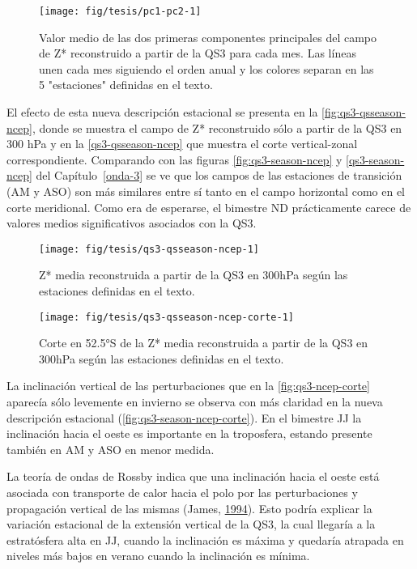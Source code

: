 \documentclass[spanish,a4paper,12pt]{book}
\begin{document}
\begin{figure*}
\texttt{[image: fig/tesis/pc1-pc2-1]} \caption{Valor medio de las dos primeras componentes principales del campo de Z* reconstruido a partir de la QS3 para cada mes. Las líneas unen cada mes siguiendo el orden anual y los colores separan en las 5 "estaciones" definidas en el texto.}\label{fig:pc1-pc2}
\end{figure*}

El efecto de esta nueva descripción estacional se presenta en la
\autoref{fig:qs3-qsseason-ncep}, donde se muestra el campo de Z*
reconstruido sólo a partir de la QS3 en 300 hPa y en la
\autoref{qs3-qsseason-ncep} que muestra el corte vertical-zonal
correspondiente. Comparando con las figuras \ref{fig:qs3-season-ncep} y
\ref{qs3-season-ncep} del Capítulo~\ref{onda-3} se ve que los campos de
las estaciones de transición (AM y ASO) son más similares entre sí tanto
en el campo horizontal como en el corte meridional. Como era de
esperarse, el bimestre ND prácticamente carece de valores medios
significativos asociados con la QS3.

\begin{figure*}
\texttt{[image: fig/tesis/qs3-qsseason-ncep-1]} \caption{Z* media reconstruida a partir de la QS3 en 300hPa según las estaciones definidas en el texto.}\label{fig:qs3-qsseason-ncep}
\end{figure*}

\begin{figure*}
\texttt{[image: fig/tesis/qs3-qsseason-ncep-corte-1]} \caption{Corte en 52.5°S de la Z* media reconstruida a partir de la QS3 en 300hPa según las estaciones definidas en el texto.}\label{fig:qs3-qsseason-ncep-corte}
\end{figure*}

La inclinación vertical de las perturbaciones que en la
\autoref{fig:qs3-ncep-corte} aparecía sólo levemente en invierno se
observa con más claridad en la nueva descripción estacional
(\autoref{fig:qs3-season-ncep-corte}). En el bimestre JJ la inclinación
hacia el oeste es importante en la troposfera, estando presente también
en AM y ASO en menor medida.

La teoría de ondas de Rossby indica que una inclinación hacia el oeste
está asociada con transporte de calor hacia el polo por las
perturbaciones y propagación vertical de las mismas (James,
\protect\hyperlink{ref-James}{1994}). Esto podría explicar la variación
estacional de la extensión vertical de la QS3, la cual llegaría a la
estratósfera alta en JJ, cuando la inclinación es máxima y quedaría
atrapada en niveles más bajos en verano cuando la inclinación es mínima.
\end{document}
